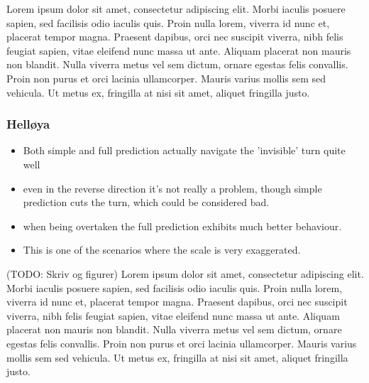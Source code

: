 Lorem ipsum dolor sit amet, consectetur adipiscing elit. Morbi iaculis posuere sapien, sed facilisis odio iaculis quis. 
Proin nulla lorem, viverra id nunc et, placerat tempor magna. Praesent dapibus, orci nec suscipit viverra, nibh felis feugiat sapien, 
vitae eleifend nunc massa ut ante. Aliquam placerat non mauris non blandit. Nulla viverra metus vel sem dictum, ornare egestas felis convallis. 
Proin non purus et orci lacinia ullamcorper. Mauris varius mollis sem sed vehicula. Ut metus ex, fringilla at nisi sit amet, aliquet fringilla justo.


\subsubsection{Helløya}
\begin{itemize}
    \item Both simple and full prediction actually navigate the 'invisible' turn quite well
    \item even in the reverse direction it's not really a problem, though simple prediction cuts the turn, which could be considered bad.
    \item when being overtaken the full prediction exhibits much better behaviour.
    \item This is one of the scenarios where the scale is very exaggerated.
\end{itemize}
(TODO: Skriv og figurer)
Lorem ipsum dolor sit amet, consectetur adipiscing elit. Morbi iaculis posuere sapien, sed facilisis odio iaculis quis. 
Proin nulla lorem, viverra id nunc et, placerat tempor magna. Praesent dapibus, orci nec suscipit viverra, nibh felis feugiat sapien, 
vitae eleifend nunc massa ut ante. Aliquam placerat non mauris non blandit. Nulla viverra metus vel sem dictum, ornare egestas felis convallis. 
Proin non purus et orci lacinia ullamcorper. Mauris varius mollis sem sed vehicula. Ut metus ex, fringilla at nisi sit amet, aliquet fringilla justo.

